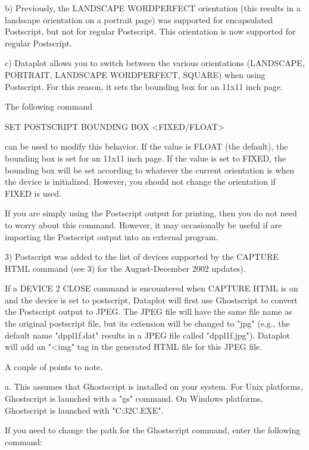 {    b) Previously, the LANDSCAPE WORDPERFECT orientation (this
       results in a landscape orientation on a portrait page)
       was supported for encapsulated Postscript, but not for
       regular Postscript.  This orientation is now supported
       for regular Postscript.

    c) Dataplot allows you to switch between the various
       orientations (LANDSCAPE, PORTRAIT, LANDSCAPE WORDPERFECT,
       SQUARE) when using Postscript.  For this reason, it sets
       the bounding box for an 11x11 inch page.

       The following command

           SET POSTSCRIPT BOUNDING BOX <FIXED/FLOAT>

       can be used to modify this behavior.  If the value is
       FLOAT (the default), the bounding box is set for an
       11x11 inch page.  If the value is set to FIXED, the
       bounding box will be set according to whatever the current
       orientation is when the device is initialized.  However,
       you should not change the orientation if FIXED is used.

       If you are simply using the Postscript output for printing,
       then you do not need to worry about this command.  However,
       it may occasionally be useful if are importing the Postscript
       output into an external program.

 3) Postscript was added to the list of devices supported by
    the CAPTURE HTML command (see 3) for the August-December 2002
    updates).

    If a DEVICE 2 CLOSE command is encountered when CAPTURE HTML
    is on and the device is set to postscript, Dataplot will first
    use Ghostscript to convert the Postscript output to JPEG.
    The JPEG file will have the same file name as the original
    postscript file, but its extension will be changed to "jpg"
    (e.g., the default name "dppl1f.dat" results in a JPEG file
    called "dppl1f.jpg").  Dataplot will add an "<img" tag in
    the generated HTML file for this JPEG file.

    A couple of points to note.

    a. This assumes that Ghostscript is installed on your
       system.  For Unix platforms, Ghostscript is launched with
       a "gs" command.  On Windows platforms, Ghostscript is
       launched with "C:\GS{}\GS\BIN\GSWIN32C.EXE".

       If you need to change the path for the Ghostscript command,
       enter the following command:

}
